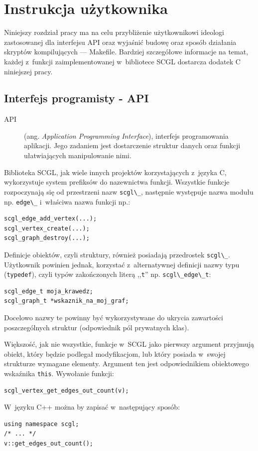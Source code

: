 \documentclass[a4paper,12pt,polish,oneside,openright]{thesis}
\newcommand\code[1]{\lstinline[style=line]{#1}}
\begin{document}
\section{Instrukcja użytkownika}
Niniejszy rozdział pracy ma na celu przybliżenie użytkownikowi ideologi zastosowanej dla interfejsu API oraz wyjaśnić budowę oraz sposób działania skryptów kompilujących --- Makefile.
Bardziej szczegółowe informacje na temat, każdej z~funkcji zaimplementowanej w~bibliotece SCGL dostarcza dodatek C niniejszej pracy.

\subsection{Interfejs programisty - API}
\label{chap:api}
\begin{description}
	\item[API] (ang. \emph{Application Programming Interface}), interfejs programowania aplikacji. Jego zadaniem jest dostarczenie struktur danych oraz funkcji ułatwiających manipulowanie nimi.
\end{description}
Biblioteka SCGL, jak wiele innych projektów korzystających z~języka C, wykorzystuje system prefiksów do nazewnictwa funkcji.
Wszystkie funkcje rozpoczynają się od przestrzeni nazw \code{scgl\_}, następnie występuje nazwa modułu np. \code{edge\_} i~właściwa nazwa funkcji np.:
\begin{lstlisting}[style=coden,caption=Przykłady przestrzeni nazw biblioteki SCGL,label=lst:funsuffix]
scgl_edge_add_vertex(...);
scgl_vertex_create(...);
scgl_graph_destroy(...);
\end{lstlisting}

Definicje obiektów, czyli struktury, również posiadają przedrostek \code{scgl\_}.
Użytkownik powinien jednak, korzystać z~alternatywnej definicji nazwy typu (\code{typedef}), czyli typów zakończonych literą ,,\code{t}'' np. \code{scgl\_edge\_t}:
\begin{lstlisting}[style=coden]
scgl_edge_t moja_krawedz;
scgl_graph_t *wskaznik_na_moj_graf;
\end{lstlisting}
Docelowo nazwy te powinny być wykorzystywane do ukrycia zawartości poszczególnych struktur (odpowiednik pól prywatnych klas).

Większość, jak nie wszystkie, funkcje w~SCGL jako pierwszy argument przyjmują obiekt, który będzie podlegał modyfikacjom, lub który posiada w~swojej strukturze wymagane elementy.
Argument ten jest odpowiednikiem obiektowego wskaźnika \code{this}.
Wywołanie funkcji:
\begin{lstlisting}[style=coden]
scgl_vertex_get_edges_out_count(v);
\end{lstlisting}
W~języku C++ można by zapisać w~następujący sposób:
\begin{lstlisting}[style=coden]
using namespace scgl;
/* ... */
v::get_edges_out_count();
\end{lstlisting}
\end{document}
